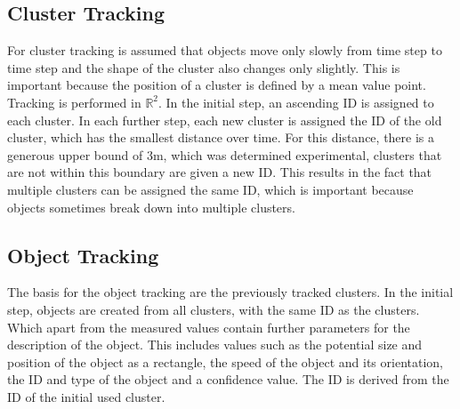 \documentclass[11pt,oneside,openright]{mpreport}
\begin{document}
\subsection{Cluster Tracking}
For cluster tracking is assumed that objects move only slowly from time step to time step and the shape of the cluster also changes only slightly. 
This is important because the position of a cluster is defined by a mean value point. Tracking is performed in $\mathbb{R}^2$. 
In the initial step, an ascending ID is assigned to each cluster.
In each further step, each new cluster is assigned the ID of the old cluster, which has the smallest distance over time.
For this distance, there is a generous upper bound of 3m, which was determined experimental, clusters that are not within this boundary are given a new ID.
This results in the fact that multiple clusters can be assigned the same ID, which is important because objects sometimes break down into multiple clusters.

\subsection{Object Tracking}
The basis for the object tracking are the previously tracked clusters. In the initial step, objects are created from all clusters, with the same ID as the clusters.
Which apart from the measured values contain further parameters for the description of the object. This includes values such as the potential size and 
position of the object as a rectangle, the speed of the object and its orientation, the ID and type of the object and a confidence value. 
The ID is derived from the ID of the initial used cluster.
\end{document}
